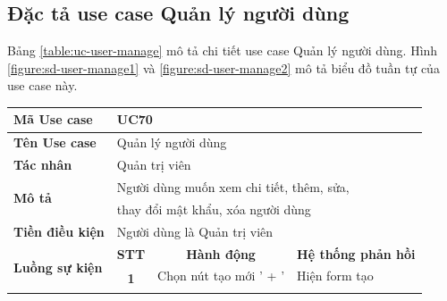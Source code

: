\documentclass[../DoAn.tex]{subfiles}
\begin{document}
\subsection{Đặc tả use case Quản lý người dùng}
\label{section:uc-user-manage}
Bảng \ref{table:uc-user-manage} mô tả chi tiết use case Quản lý người dùng. Hình \ref{figure:sd-user-manage1} và \ref{figure:sd-user-manage2} mô tả biểu đồ tuần tự của use case này.
\begin{table}[H]
    \begin{tabular}{|l|c|l|l|}
        \hline
        \textbf{Mã Use case}                     & \multicolumn{3}{l|}{UC70}                                                                                                                                                  \\ \hline
        \textbf{Tên Use case}                    & \multicolumn{3}{l|}{Quản lý người dùng}                                                                                                                                    \\ \hline
        \textbf{Tác nhân}                        & \multicolumn{3}{l|}{Quản trị viên}                                                                                                                                         \\ \hline
        \multirow{2}{*}{\textbf{Mô tả} }         & \multicolumn{3}{l|}{Người dùng muốn xem chi tiết, thêm, sửa,}                                                                                                              \\
                                                 & \multicolumn{3}{l|}{thay đổi mật khẩu, xóa người dùng}                                                                                                                     \\ \hline
        \textbf{Tiền điều kiện}                  & \multicolumn{3}{l|}{Người dùng là Quản trị viên}                                                                                                                           \\ \hline
        \multirow{9}{*}{\textbf{Luồng sự kiện}}  & \multicolumn{1}{c|}{\textbf{STT}}                                            & \multicolumn{1}{c|}{\textbf{Hành động}}   & \multicolumn{1}{c|}{\textbf{Hệ thống phản hồi}} \\ \cline{2-4}
                                                 & \multirow{3}{*}{\textbf{1}}                                                  & Chọn nút tạo mới ' + '                    & Hiện form tạo                                   \\ \cline{3-4}

\end{tabular}
\end{table}
\end{document}
